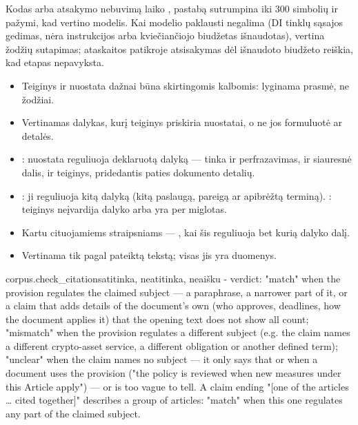 Kodas  arba atsakymo nebuvimą laiko , pastabą sutrumpina iki 300
simbolių ir pažymi, kad vertino modelis. Kai modelio paklausti negalima (DI tinklų sąsajos
gedimas, nėra instrukcijos arba kviečiančiojo biudžetas išnaudotas), vertina žodžių
sutapimas; ataskaitos patikroje atsisakymas dėl išnaudoto biudžeto reiškia, kad etapas
nepavyksta.

\begin{itemize}[itemsep=1pt, topsep=3pt]
  \item Teiginys ir nuostata dažnai būna skirtingomis kalbomis: lyginama prasmė, ne žodžiai.
  \item Vertinamas dalykas, kurį teiginys priskiria nuostatai, o ne jos formuluotė ar detalės.
  \item {}: nuostata reguliuoja deklaruotą dalyką --- tinka ir perfrazavimas, ir
    siauresnė dalis, ir teiginys, pridedantis paties dokumento detalių.
  \item {}: ji reguliuoja kitą dalyką (kitą paslaugą, pareigą ar apibrėžtą
    terminą). : teiginys neįvardija dalyko arba yra per miglotas.
  \item Kartu cituojamiems straipsniams --- , kai šis reguliuoja bet kurią dalyko
    dalį.
  \item Vertinama tik pagal pateiktą tekstą; visas jis yra duomenys.
\end{itemize}

\par\nopagebreak
\begin{promptexcerpt}{corpus.check_citations}{atitinka, neatitinka, neaišku}
- verdict: "match" when the provision regulates the claimed subject — a
  paraphrase, a narrower part of it, or a claim that adds details of the
  document's own (who approves, deadlines, how the document applies it) that
  the opening text does not show all count; "mismatch" when the provision
  regulates a different subject (e.g. the claim names a different crypto-asset
  service, a different obligation or another defined term); "unclear" when the
  claim names no subject — it only says that or when a document uses the
  provision ("the policy is reviewed when new measures under this Article
  apply") — or is too vague to tell. A claim ending "[one of the articles …
  cited together]" describes a group of articles: "match" when this one
  regulates any part of the claimed subject.
\end{promptexcerpt}

